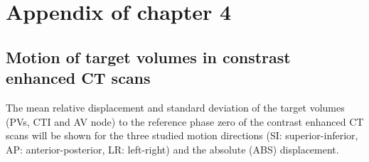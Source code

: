




\chapter{Appendix of chapter 4}
\label{app:pigs}

\section{Motion of target volumes in constrast enhanced CT scans}
\label{app:pigs:motion}
The mean relative displacement and standard deviation of the target volumes (PVs, CTI and AV node) to the reference phase zero of the contrast enhanced CT scans 
will be shown for the three studied motion directions (SI: superior-inferior, AP: anterior-posterior, LR: left-right) and the absolute (ABS) 
displacement.

